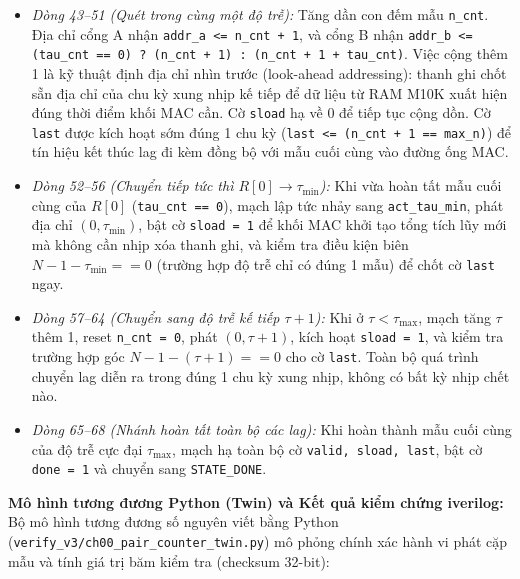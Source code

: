 \begin{itemize}[leftmargin=1.5em, itemsep=2pt]
    \begin{itemize}[leftmargin=1.2em, itemsep=2pt]
        \item \emph{Dòng 43--51 (Quét trong cùng một độ trễ):} Tăng dần con đếm mẫu \texttt{n\_cnt}. Địa chỉ cổng A nhận \texttt{addr\_a <= n\_cnt + 1}, và cổng B nhận \texttt{addr\_b <= (tau\_cnt == 0) ? (n\_cnt + 1) : (n\_cnt + 1 + tau\_cnt)}. Việc cộng thêm 1 là kỹ thuật định địa chỉ nhìn trước (look-ahead addressing): thanh ghi chốt sẵn địa chỉ của chu kỳ xung nhịp kế tiếp để dữ liệu từ RAM M10K xuất hiện đúng thời điểm khối MAC cần. Cờ \texttt{sload} hạ về 0 để tiếp tục cộng dồn. Cờ \texttt{last} được kích hoạt sớm đúng 1 chu kỳ (\texttt{last <= (n\_cnt + 1 == max\_n)}) để tín hiệu kết thúc lag đi kèm đồng bộ với mẫu cuối cùng vào đường ống MAC.
        \item \emph{Dòng 52--56 (Chuyển tiếp tức thì $R[0] \to \tau_{\min}$):} Khi vừa hoàn tất mẫu cuối cùng của $R[0]$ (\texttt{tau\_cnt == 0}), mạch lập tức nhảy sang \texttt{act\_tau\_min}, phát địa chỉ $(0, \tau_{\min})$, bật cờ \texttt{sload = 1} để khối MAC khởi tạo tổng tích lũy mới mà không cần nhịp xóa thanh ghi, và kiểm tra điều kiện biên $N - 1 - \tau_{\min} == 0$ (trường hợp độ trễ chỉ có đúng 1 mẫu) để chốt cờ \texttt{last} ngay.
        \item \emph{Dòng 57--64 (Chuyển sang độ trễ kế tiếp $\tau+1$):} Khi ở $\tau < \tau_{\max}$, mạch tăng $\tau$ thêm 1, reset \texttt{n\_cnt = 0}, phát $(0, \tau+1)$, kích hoạt \texttt{sload = 1}, và kiểm tra trường hợp góc $N - 1 - (\tau+1) == 0$ cho cờ \texttt{last}. Toàn bộ quá trình chuyển lag diễn ra trong đúng 1 chu kỳ xung nhịp, không có bất kỳ nhịp chết nào.
        \item \emph{Dòng 65--68 (Nhánh hoàn tất toàn bộ các lag):} Khi hoàn thành mẫu cuối cùng của độ trễ cực đại $\tau_{\max}$, mạch hạ toàn bộ cờ \texttt{valid, sload, last}, bật cờ \texttt{done = 1} và chuyển sang \texttt{STATE\_DONE}.
    \end{itemize}
\end{itemize}

\textbf{Mô hình tương đương Python (Twin) và Kết quả kiểm chứng iverilog:}
Bộ mô hình tương đương số nguyên viết bằng Python (\texttt{verify\_v3/ch00\_pair\_counter\_twin.py}) mô phỏng chính xác hành vi phát cặp mẫu và tính giá trị băm kiểm tra (checksum 32-bit):

